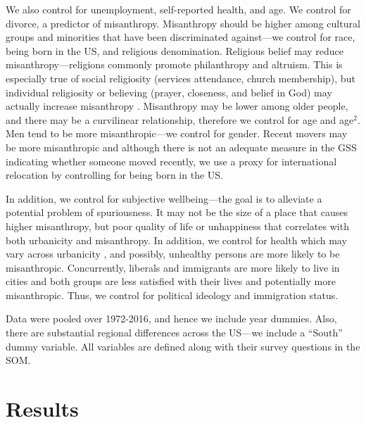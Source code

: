 \documentclass[11pt, letterpaper]{article}
\begin{document}
\begin{spacing}{1.4}
We also control for unemployment, self-reported health, and age. We control for
divorce, a predictor of misanthropy.  Misanthropy should be higher among
cultural groups and minorities that have been discriminated against---we control
for race, being born in the US, and religious denomination. Religious belief may
reduce misanthropy---religions commonly promote philanthropy and altruism. This
is especially true of social religiosity (services attendance, church
membership), but individual religiosity or believing (prayer, closeness, and
belief in God) may actually increase misanthropy \citep{aok20rel}. Misanthropy
may be lower among older people, and there may be a curvilinear relationship,
therefore we control for age and age$^2$. Men tend to be more misanthropic---we
control for gender. Recent movers may be more misanthropic and although there is not an adequate measure in the GSS indicating whether someone moved recently, we use a proxy for international relocation by controlling for being born in the US.

In addition, we control for subjective wellbeing---the goal is to alleviate a potential problem of spuriousness. It may not be the size of a place that causes higher misanthropy, but %
poor quality of life or unhappiness \citep{aok21} that correlates with
both urbanicity and misanthropy.  %
 In addition, we control for health which may vary across urbanicity
 \citep[e.g.,][]{chen2019differences}, and possibly, unhealthy persons are more likely to be misanthropic.  
 Concurrently, liberals and immigrants are more likely to live in cities and both groups are less satisfied with their lives \citep{aok11a,aokJap14} and potentially more misanthropic. Thus, we control for political ideology and immigration status.

Data were pooled over 1972-2016, and hence we include year dummies. Also, there
are substantial regional differences across the US---we include a ``South'' dummy variable. All variables are defined along with their survey questions in the SOM.

\section*{Results}


\end{spacing}
\end{document}
